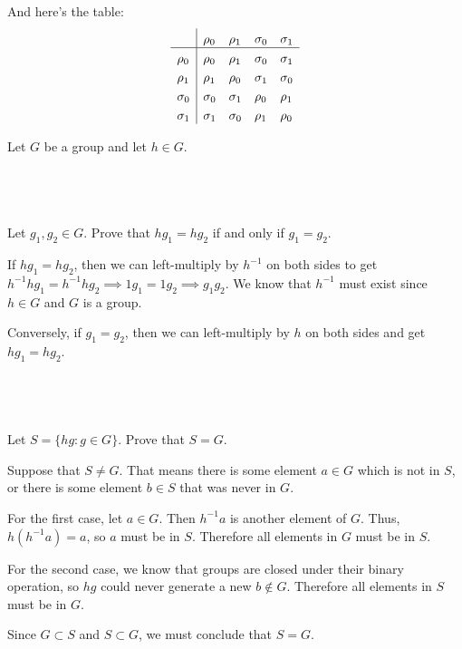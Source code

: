 \documentclass[a4paper]{article}
\begin{document}
And here's the table:
\[
\setlength{\extrarowheight}{3pt}%
\begin{array}{l|*{4}{l}} %
    & \rho_0 & \rho_1 & \sigma_0 & \sigma_1 \\
\hline %
\rho_0 & \rho_0 & \rho_1 & \sigma_0 & \sigma_1 \\
\rho_1 & \rho_1 & \rho_0 & \sigma_1 & \sigma_0 \\
\sigma_0 & \sigma_0 & \sigma_1 & \rho_0 & \rho_1 \\
\sigma_1 & \sigma_1 & \sigma_0 & \rho_1 & \rho_0 \\
\end{array}
\]


\begin{questionbody}
Let $G$ be a group and let $h \in G$.
\end{questionbody}

\subsection{~} %

\begin{questionbody}
Let $g_1, g_2 \in G$. Prove that $h g_1 = h g_2$ if and only if $g_1 = g_2$.
\end{questionbody}

If $h g_1 = h g_2$, then we can left-multiply by $h^{-1}$ on both sides to get $h^{-1} h g_1 = h^{-1} h g_2 \implies 1 g_1 = 1 g_2 \implies g_1 g_2$. We know that $h^{-1}$ must exist since $h \in G$ and $G$ is a group.

Conversely, if $g_1 = g_2$, then we can left-multiply by $h$ on both sides and get $h g_1 = h g_2$.

\subsection{~} %

\begin{questionbody}
Let $S = \{hg : g \in G\}$. Prove that $S = G$.
\end{questionbody}

Suppose that $S \ne G$. That means there is some element $a \in G$ which is not in $S$, or there is some element $b \in S$ that was never in $G$.

For the first case, let $a \in G$. Then $h^{-1} a$ is another element of $G$. Thus, $h \left( h^{-1} a \right) = a$, so $a$ must be in $S$. Therefore all elements in $G$ must be in $S$.

For the second case, we know that groups are closed under their binary operation, so $hg$ could never generate a new $b \notin G$. Therefore all elements in $S$ must be in $G$.

Since $G \subset S$ and $S \subset G$, we must conclude that $S = G$.
\end{document}
